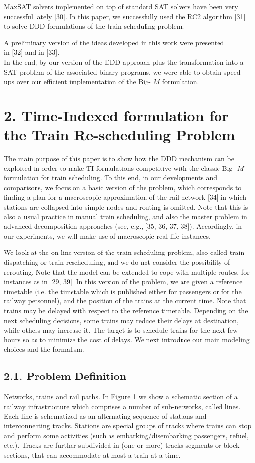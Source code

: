 \documentclass[10pt]{article}
\begin{document}
MaxSAT solvers implemented on top of standard SAT solvers have been very successful lately [30]. In this paper, we successfully used the RC2 algorithm [31] to solve DDD formulations of the train scheduling problem.

A preliminary version of the ideas developed in this work were presented\\[0pt]
in [32] and in [33].\\
In the end, by our version of the DDD approach plus the transformation into a SAT problem of the associated binary programs, we were able to obtain speed-ups over our efficient implementation of the Big- $M$ formulation.

\section*{2. Time-Indexed formulation for the Train Re-scheduling Problem}
The main purpose of this paper is to show how the DDD mechanism can be exploited in order to make TI formulations competitive with the classic Big- $M$ formulation for train scheduling. To this end, in our developments and comparisons, we focus on a basic version of the problem, which corresponds to finding a plan for a macroscopic approximation of the rail network [34] in which stations are collapsed into simple nodes and routing is omitted. Note that this is also a usual practice in manual train scheduling, and also the master problem in advanced decomposition approaches (see, e.g., [35, 36, 37, 38]). Accordingly, in our experiments, we will make use of macroscopic real-life instances.

We look at the on-line version of the train scheduling problem, also called train dispatching or train rescheduling, and we do not consider the possibility of rerouting. Note that the model can be extended to cope with multiple routes, for instances as in [29, 39]. In this version of the problem, we are given a reference timetable (i.e. the timetable which is published either for passengers or for the railway personnel), and the position of the trains at the current time. Note that trains may be delayed with respect to the reference timetable. Depending on the next scheduling decisions, some trains may reduce their delays at destination, while others may increase it. The target is to schedule trains for the next few hours so as to minimize the cost of delays. We next introduce our main modeling choices and the formalism.

\subsection*{2.1. Problem Definition}
Networks, trains and rail paths. In Figure 1 we show a schematic section of a railway infrastructure which comprises a number of sub-networks, called lines. Each line is schematized as an alternating sequence of stations and interconnecting tracks. Stations are special groups of tracks where trains can stop and perform some activities (such as embarking/disembarking passengers, refuel, etc.). Tracks are further subdivided in (one or more) tracks segments or block sections, that can accommodate at most a train at a time.
\end{document}
